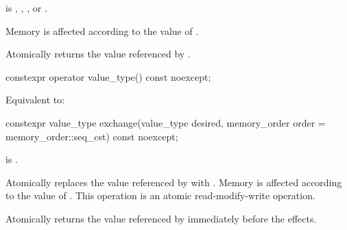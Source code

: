 \begin{itemdescr}
\pnum
\expects
{} is
,
,
, or
.

\pnum
\effects
Memory is affected according to the value of .

\pnum
\returns
Atomically returns the value referenced by .
\end{itemdescr}

%
%
%
%
\begin{itemdecl}
constexpr operator value_type() const noexcept;
\end{itemdecl}

\begin{itemdescr}
\pnum
\effects
Equivalent to: 
\end{itemdescr}

%
%
%
%
\begin{itemdecl}
constexpr value_type exchange(value_type desired,
                              memory_order order = memory_order::seq_cst) const noexcept;
\end{itemdecl}

\begin{itemdescr}
\pnum
\constraints
{} is .

\pnum
\effects
Atomically replaces the value referenced by 
with .
Memory is affected according to the value of .
This operation is an atomic read-modify-write operation.

\pnum
\returns
Atomically returns the value referenced by 
immediately before the effects.
\end{itemdescr}

